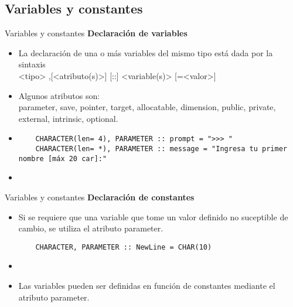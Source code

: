 
\subsection{Variables y constantes}

\begin{frame}[fragile]{Variables y constantes}
\textbf{Declaración de variables}
 \begin{itemize}[<+(1)->]
  \item La declaración de una o más variables del mismo tipo está dada por la sintaxis\\ 
   \centering <tipo> ,[<atributo(s)>] [::] <variable(s)> [=<valor>]
  \item Algunos atributos son:\\ 
  parameter, save, pointer, target, allocatable, dimension, public, private, external, intrinsic, optional.
  \vspace{6pt}
  \item []
   \begin{verbatim}
    CHARACTER(len= 4), PARAMETER :: prompt = ">>> "
    CHARACTER(len= *), PARAMETER :: message = "Ingresa tu primer nombre [máx 20 car]:"
   \end{verbatim}
  \item[] 
 \end{itemize}
\end{frame}

\begin{frame}[fragile]{Variables y constantes}
\textbf{Declaración de constantes}
 \begin{itemize}[<+(1)->]
  \item Si se requiere que una variable que tome un valor definido no suceptible de cambio, se utiliza el atributo parameter. \\ 
   \begin{verbatim}
    CHARACTER, PARAMETER :: NewLine = CHAR(10)
   \end{verbatim}
   \item[] 
   \vspace{-3pt}
   \item Las variables pueden ser definidas en función de constantes mediante el atributo parameter.
 \end{itemize}
\end{frame}
